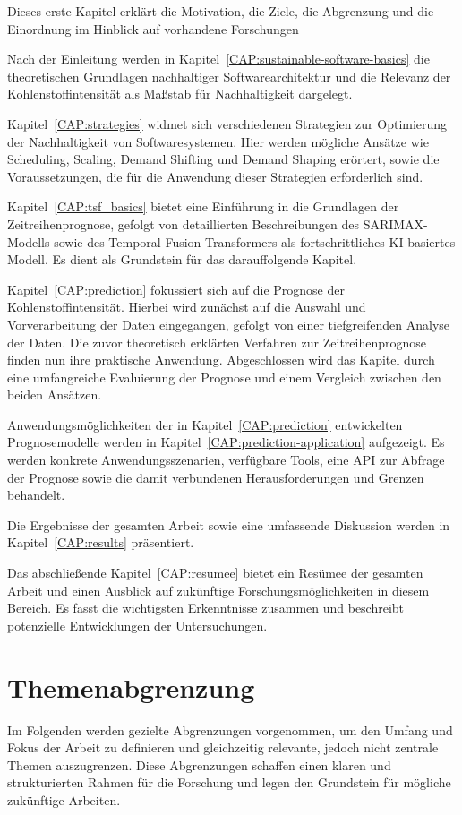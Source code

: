 Dieses erste Kapitel erklärt die Motivation, die Ziele, die Abgrenzung und die Einordnung im Hinblick auf vorhandene Forschungen

Nach der Einleitung werden in Kapitel~\ref{CAP:sustainable-software-basics} die theoretischen Grundlagen nachhaltiger Softwarearchitektur und die Relevanz der Kohlenstoffintensität als Maßstab für Nachhaltigkeit dargelegt.

Kapitel~\ref{CAP:strategies} widmet sich verschiedenen Strategien zur Optimierung der Nachhaltigkeit von Softwaresystemen.
Hier werden mögliche Ansätze wie Scheduling, Scaling, Demand Shifting und Demand Shaping erörtert, sowie die Voraussetzungen, die für die Anwendung dieser Strategien erforderlich sind.

Kapitel~\ref{CAP:tsf_basics} bietet eine Einführung in die Grundlagen der Zeitreihenprognose, gefolgt von detaillierten Beschreibungen des SARIMAX-Modells sowie des Temporal Fusion Transformers als fortschrittliches KI-basiertes Modell.
Es dient als Grundstein für das darauffolgende Kapitel.

Kapitel~\ref{CAP:prediction} fokussiert sich auf die Prognose der Kohlenstoffintensität.
Hierbei wird zunächst auf die Auswahl und Vorverarbeitung der Daten eingegangen, gefolgt von einer tiefgreifenden Analyse der Daten.
Die zuvor theoretisch erklärten Verfahren zur Zeitreihenprognose finden nun ihre praktische Anwendung.
Abgeschlossen wird das Kapitel durch eine umfangreiche Evaluierung der Prognose und einem Vergleich zwischen den beiden Ansätzen.

Anwendungsmöglichkeiten der in Kapitel~\ref{CAP:prediction} entwickelten Prognosemodelle werden in Kapitel~\ref{CAP:prediction-application} aufgezeigt.
Es werden konkrete Anwendungsszenarien, verfügbare Tools, eine API zur Abfrage der Prognose sowie die damit verbundenen Herausforderungen und Grenzen behandelt.

Die Ergebnisse der gesamten Arbeit sowie eine umfassende Diskussion werden in Kapitel~\ref{CAP:results} präsentiert.

Das abschließende Kapitel~\ref{CAP:resumee} bietet ein Resümee der gesamten Arbeit und einen Ausblick auf zukünftige Forschungsmöglichkeiten in diesem Bereich.
Es fasst die wichtigsten Erkenntnisse zusammen und beschreibt potenzielle Entwicklungen der Untersuchungen.

\section{Themenabgrenzung}
Im Folgenden werden gezielte Abgrenzungen vorgenommen, um den Umfang und Fokus der Arbeit zu definieren und gleichzeitig relevante, jedoch nicht zentrale Themen auszugrenzen.
Diese Abgrenzungen schaffen einen klaren und strukturierten Rahmen für die Forschung und legen den Grundstein für mögliche zukünftige Arbeiten.

